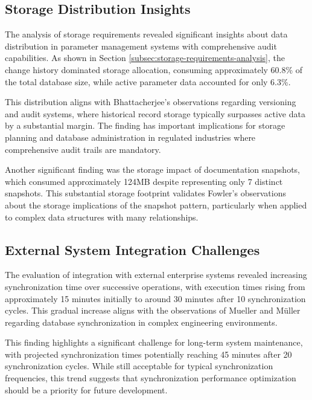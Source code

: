 \subsection{Storage Distribution Insights}
\label{subsec:storage-distribution}

The analysis of storage requirements revealed significant insights about data distribution in parameter management systems with comprehensive audit capabilities. As shown in Section \ref{subsec:storage-requirements-analysis}, the change history dominated storage allocation, consuming approximately 60.8\% of the total database size, while active parameter data accounted for only 6.3\%.

This distribution aligns with Bhattacherjee's observations \cite{bhattacherjee2015principles} regarding versioning and audit systems, where historical record storage typically surpasses active data by a substantial margin. The finding has important implications for storage planning and database administration in regulated industries where comprehensive audit trails are mandatory.

Another significant finding was the storage impact of documentation snapshots, which consumed approximately 124MB despite representing only 7 distinct snapshots. This substantial storage footprint validates Fowler's observations \cite{fowler2003patterns} about the storage implications of the snapshot pattern, particularly when applied to complex data structures with many relationships.

\subsection{External System Integration Challenges}
\label{subsec:integration-challenges}

The evaluation of integration with external enterprise systems revealed increasing synchronization time over successive operations, with execution times rising from approximately 15 minutes initially to around 30 minutes after 10 synchronization cycles. This gradual increase aligns with the observations of Mueller and Müller \cite{mueller2018conception} regarding database synchronization in complex engineering environments.

This finding highlights a significant challenge for long-term system maintenance, with projected synchronization times potentially reaching 45 minutes after 20 synchronization cycles. While still acceptable for typical synchronization frequencies, this trend suggests that synchronization performance optimization should be a priority for future development.

